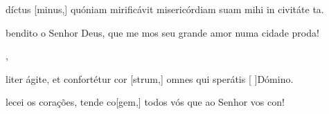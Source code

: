 {  {\item {}díctus [minus,] quóniam mirificávit misericórdiam suam mihi in civitáte ta.~\Antiphona}%
    {\item {} bendito o Senhor Deus, que me mos seu grande amor numa cidade proda!~\Antiphona},
  {\item {}liter ágite, et confortétur cor [strum,] omnes qui sperátis [ ]{Dó}mino.~\Antiphona}
    {\item {}lecei os corações, tende co[gem,] todos vós que ao Senhor vos con!~\Antiphona}
}